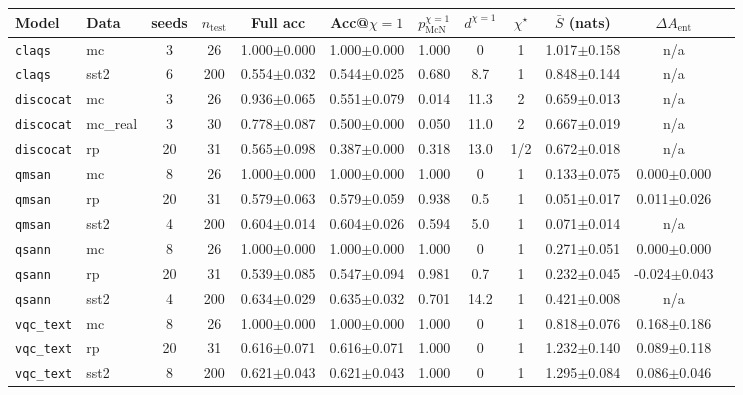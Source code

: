 \begin{tabular}{llcccccccccc}
\toprule
Model & Data & seeds & $n_{\mathrm{test}}$ & Full acc & Acc@$\chi{=}1$ & $p_{\mathrm{McN}}^{\chi=1}$ & $d^{\chi=1}$ & $\chi^\star$ & $\bar{S}$ (nats) & $\Delta A_{\mathrm{ent}}$ \\
\midrule
\texttt{claqs} & mc & 3 & 26 & 1.000$\pm$0.000 & 1.000$\pm$0.000 & 1.000 & 0 & 1 & 1.017$\pm$0.158 & n/a \\
\texttt{claqs} & sst2 & 6 & 200 & 0.554$\pm$0.032 & 0.544$\pm$0.025 & 0.680 & 8.7 & 1 & 0.848$\pm$0.144 & n/a \\
\texttt{discocat} & mc & 3 & 26 & 0.936$\pm$0.065 & 0.551$\pm$0.079 & 0.014 & 11.3 & 2 & 0.659$\pm$0.013 & n/a \\
\texttt{discocat} & mc\_real & 3 & 30 & 0.778$\pm$0.087 & 0.500$\pm$0.000 & 0.050 & 11.0 & 2 & 0.667$\pm$0.019 & n/a \\
\texttt{discocat} & rp & 20 & 31 & 0.565$\pm$0.098 & 0.387$\pm$0.000 & 0.318 & 13.0 & 1/2 & 0.672$\pm$0.018 & n/a \\
\texttt{qmsan} & mc & 8 & 26 & 1.000$\pm$0.000 & 1.000$\pm$0.000 & 1.000 & 0 & 1 & 0.133$\pm$0.075 & 0.000$\pm$0.000 \\
\texttt{qmsan} & rp & 20 & 31 & 0.579$\pm$0.063 & 0.579$\pm$0.059 & 0.938 & 0.5 & 1 & 0.051$\pm$0.017 & 0.011$\pm$0.026 \\
\texttt{qmsan} & sst2 & 4 & 200 & 0.604$\pm$0.014 & 0.604$\pm$0.026 & 0.594 & 5.0 & 1 & 0.071$\pm$0.014 & n/a \\
\texttt{qsann} & mc & 8 & 26 & 1.000$\pm$0.000 & 1.000$\pm$0.000 & 1.000 & 0 & 1 & 0.271$\pm$0.051 & 0.000$\pm$0.000 \\
\texttt{qsann} & rp & 20 & 31 & 0.539$\pm$0.085 & 0.547$\pm$0.094 & 0.981 & 0.7 & 1 & 0.232$\pm$0.045 & -0.024$\pm$0.043 \\
\texttt{qsann} & sst2 & 4 & 200 & 0.634$\pm$0.029 & 0.635$\pm$0.032 & 0.701 & 14.2 & 1 & 0.421$\pm$0.008 & n/a \\
\texttt{vqc\_text} & mc & 8 & 26 & 1.000$\pm$0.000 & 1.000$\pm$0.000 & 1.000 & 0 & 1 & 0.818$\pm$0.076 & 0.168$\pm$0.186 \\
\texttt{vqc\_text} & rp & 20 & 31 & 0.616$\pm$0.071 & 0.616$\pm$0.071 & 1.000 & 0 & 1 & 1.232$\pm$0.140 & 0.089$\pm$0.118 \\
\texttt{vqc\_text} & sst2 & 8 & 200 & 0.621$\pm$0.043 & 0.621$\pm$0.043 & 1.000 & 0 & 1 & 1.295$\pm$0.084 & 0.086$\pm$0.046 \\
\bottomrule
\end{tabular}
